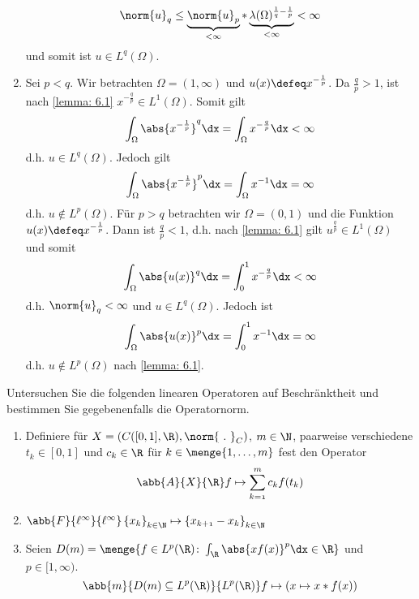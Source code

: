 \begin{exercisePage}
\begin{enumerate}[label=(zu \alph*), leftmargin=\zulength]
		\begin{equation*}
			\norm{u}_q \le \underbrace{\norm{u}_p}_{< \infty} * \underbrace{\lambda(\Omega)^{\frac{1}{q} - \frac{1}{p}}}_{< \infty} < \infty
		\end{equation*}
		und somit ist $u \in L^q(\Omega)$.
		\pagebreak
		\item Sei $p < q$. Wir betrachten $\Omega = (1,\infty)$ und $u(x) \defeq x^{-\frac{1}{p}}$. Da $\frac{q}{p} > 1$, ist nach \cref{lemma: 6.1} $x^{-\frac{q}{p}} \in L^1(\Omega)$. Somit gilt
		\begin{equation*}
			\int_\Omega \abs{x^{-\frac{1}{p}}}^q \dx = \int_\Omega x^{-\frac{q}{p}} \dx < \infty
		\end{equation*}
		d.h. $u \in L^q(\Omega)$. Jedoch gilt
		\begin{equation*}
			\int_\Omega \abs{x^{-\frac{1}{p}}}^p \dx = \int_\Omega x^{-1} \dx = \infty
		\end{equation*}
		d.h. $u \notin L^p(\Omega)$.
		Für $p > q$ betrachten wir $\Omega = (0,1)$ und die Funktion $u(x) \defeq x^{-\frac{1}{p}}$. Dann ist $\frac{q}{p} < 1$, d.h. nach \cref{lemma: 6.1} gilt $u^{\frac{q}{p}} \in L^1(\Omega)$ und somit 
		\begin{equation*}
			\int_\Omega \abs{u(x)}^q \dx = \int_0^1 x^{-\frac{q}{p}} \dx < \infty
		\end{equation*}
		d.h. $\norm{u}_q < \infty$ und $u \in L^q(\Omega)$. Jedoch ist
		\begin{equation*}
			\int_\Omega \abs{u(x)}^p \dx = \int_0^1 x^{-1} \dx = \infty
		\end{equation*}
		d.h. $u \notin L^p(\Omega)$ nach \cref{lemma: 6.1}.
	\end{enumerate}
	
	
	
	
	
	\begin{exercise}
		Untersuchen Sie die folgenden linearen Operatoren auf Beschränktheit und bestimmen Sie gegebenenfalls die Operatornorm.
		\begin{enumerate}[topsep=-\parskip]
			\item Definiere für $X = (C([0,1],\R), \norm{\ . \ }_C)$, $m \in \N$, paarweise verschiedene $t_k \in [0,1]$ und $c_k \in \R$ für $k \in \menge{1, \dots, m}$ fest den Operator
			\begin{equation*}
				\abb{A}{X}{\R} \mit f \mapsto \sum_{k=1}^m c_k f(t_k)
			\end{equation*}
			\item $\abb{F}{\ell^\infty}{\ell^\infty} \mit \folge{x_k}{k \in \N} \mapsto \folge{x_{k+1} - x_k}{k \in \N}$
			\item Seien $D(m) = \menge{f \in L^p(\R) \colon \int_\R \abs{xf(x)}^p \dx \in \R}$ und $p \in [1,\infty)$.
			\begin{equation*}
				\abb{m}{D(m) \subseteq L^p(\R)}{L^p(\R)} \mit f \mapsto (x \mapsto x * f(x))
			\end{equation*}			
		\end{enumerate}
	\end{exercise}


\end{exercisePage}
